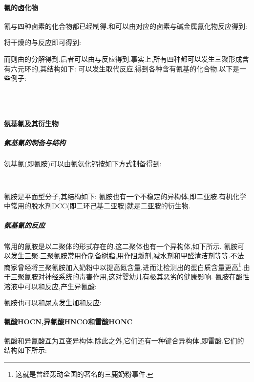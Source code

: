 \documentclass{ctexart}
\begin{document}
\paragraph{氰的卤化物}
氰与四种卤素的化合物都已经制得.和可以由对应的卤素与碱金属氰化物反应得到:
\begin{center}
\end{center}
将干燥的与反应即可得到:
\begin{center}
\end{center}
而则由的分解得到.后者可以由与反应得到.事实上,所有四种都可以发生三聚形成含有六元环的,其结构如下:
可以发生取代反应,得到各种含有氰基的化合物.以下是一些例子:
\begin{center}
    \\
    \\
\end{center}
\paragraph{氨基氰及其衍生物}
\subparagraph{氨基氰的制备与结构}
氨基氰(即氰胺)可以由氰氨化钙按如下方式制备得到:
\begin{center}
    \\
\end{center}
氰胺是平面型分子,其结构如下:
氰胺也有一个不稳定的异构体,即二亚胺.有机化学中常用的脱水剂DCC(即二环己基二亚胺)就是二亚胺的衍生物.
\subparagraph{氨基氰的反应}
\indent 常用的氰胺是以二聚体的形式存在的.这二聚体也有一个异构体,如下所示.
氰胺可以发生三聚.三聚氰胺常用作制备树脂,用作阻燃剂,减水剂和甲醛清洁剂等等.不法商家曾经将三聚氰胺加入奶粉中以提高氮含量,进而让检测出的蛋白质含量更高\footnote{这就是曾经轰动全国的著名的三鹿奶粉事件.}.由于三聚氰胺对神经系统的毒害作用,这对婴幼儿有极其恶劣的健康影响.
氰胺在酸性溶液中可以和反应,产生异氰酸:
\begin{center}
\end{center}
氰胺也可以和尿素发生加和反应:
\begin{center}
\end{center}
\paragraph{氰酸HOCN,异氰酸HNCO和雷酸HONC}
氰酸和异氰酸互为互变异构体.除此之外,它们还有一种键合异构体,即雷酸.它们的结构如下所示:
\end{document}
